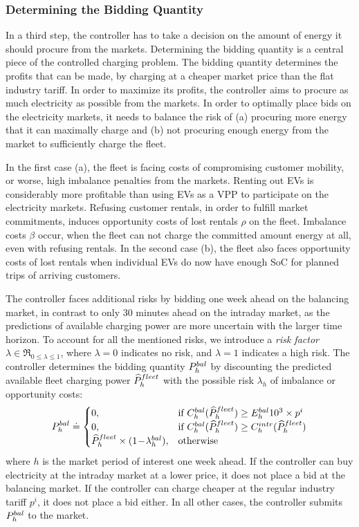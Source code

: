 \documentclass[a4paper, 12pt]{article}
\begin{document}
\subsubsection{Determining the Bidding Quantity}
\label{sec:org6feea74}
In a third step, the controller has to take a decision on the amount of energy
it should procure from the markets. Determining the bidding quantity is a
central piece of the controlled charging problem. The bidding quantity
determines the profits that can be made, by charging at a cheaper market price
than the flat industry tariff. In order to maximize its profits, the controller
aims to procure as much electricity as possible from the markets. In order to
optimally place bids on the electricity markets, it needs to balance the risk of
(a) procuring more energy that it can maximally charge and (b) not procuring
enough energy from the market to sufficiently charge the fleet.

In the first case (a), the fleet is facing costs of compromising customer
mobility, or worse, high imbalance penalties from the markets. Renting out EVs
is considerably more profitable than using EVs as a VPP to participate on the
electricity markets. Refusing customer rentals, in order to fulfill market
commitments, induces opportunity costs of lost rentals \(\rho\) on the fleet.
Imbalance costs \(\beta\) occur, when the fleet can not charge the committed
amount energy at all, even with refusing rentals. In the second case (b), the
fleet also faces opportunity costs of lost rentals when individual EVs do now
have enough SoC for planned trips of arriving customers.

The controller faces additional risks by bidding one week ahead on the balancing
market, in contrast to only 30 minutes ahead on the intraday market, as the
predictions of available charging power are more uncertain with the larger time
horizon. To account for all the mentioned risks, we introduce a \emph{risk factor}
\(\lambda \in \Re_{0 \leq \lambda \leq 1}\), where \(\lambda = 0\) indicates no
risk, and \(\lambda = 1\) indicates a high risk. The controller determines the
bidding quantity \(P^{bal}_{h}\) by discounting the predicted available fleet charging
power \(\widehat{P}^{fleet}_{h}\) with the possible risk \(\lambda_{h}\) of imbalance or
opportunity costs:
\begin{equation} \label{eq-model-pb}
  P^{bal}_{h} \doteq
  \begin{cases}
    0, & \text{if}\ C^{bal}_{h}(\widehat{P}^{fleet}_{h}) \geq E^{bal}_{h}10^3 \times p^{i}\\
    0, & \text{if}\ C^{bal}_{h}(\widehat{P}^{fleet}_{h}) \geq C^{intr}_{h}(\widehat{P}^{fleet}_{h})\\
    \widehat{P}^{fleet}_{h} \times (1\!-\!\lambda^{bal}_{h}), & \text{otherwise}
  \end{cases}
\end{equation}
where \(h\) is the market period of interest one week ahead. If the controller can
buy electricity at the intraday market at a lower price, it does not place a bid
at the balancing market. If the controller can charge cheaper at the regular
industry tariff \(p^{i}\), it does not place a bid either. In all other cases, the
controller submits \(P^{bal}_{h}\) to the market.
\end{document}
